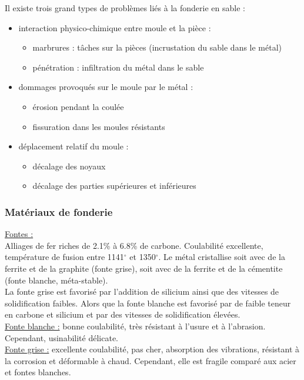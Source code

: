 \documentclass[../main.tex]{subfiles}
\begin{document}
Il existe trois grand types de problèmes liés à la fonderie en sable :\\
\begin{itemize}
    \item interaction physico-chimique entre moule et la pièce : \begin{itemize}
        \item marbrures : tâches sur la pièces (incrustation du sable dans le métal)\\
        \item pénétration : infiltration du métal dans le sable\\
    \end{itemize}
    \item dommages provoqués sur le moule par le métal : \begin{itemize}
        \item érosion pendant la coulée\\
        \item fissuration dans les moules résistants\\
    \end{itemize}
    \item déplacement relatif du moule :\begin{itemize}
        \item décalage des noyaux\\
        \item décalage des parties supérieures et inférieures\\
    \end{itemize}
\end{itemize}

\subsubsection{Matériaux de fonderie}
\quad \underline{Fontes :}\\
Alliages de fer riches de 2.1\% à 6.8\% de carbone. Coulabilité excellente, température de fusion entre 1141$^\circ$ et 1350$^\circ$. Le métal cristallise soit avec de la ferrite et de la graphite (fonte grise), soit avec de la ferrite et de la cémentite (fonte blanche, méta-stable).\\

La fonte grise est favorisé par l'addition de silicium ainsi que des vitesses de solidification faibles. Alors que la fonte blanche est favorisé par de faible teneur en carbone et silicium et par des vitesses de solidification élevées.\\
\underline{Fonte blanche :} bonne coulabilité, très résistant à l'usure et à l'abrasion. Cependant, usinabilité délicate.\\
\underline{Fonte grise :} excellente coulabilité, pas cher, absorption des vibrations, résistant à la corrosion et déformable à chaud. Cependant, elle est fragile comparé aux acier et fontes blanches.\\
\end{document}
